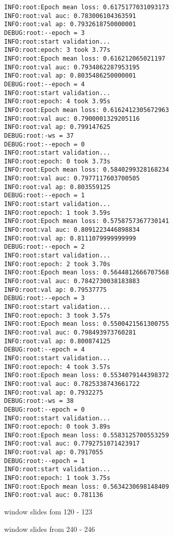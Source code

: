 \documentclass[11pt]{article}
\begin{document}
\begin{verbatim}
INFO:root:Epoch mean loss: 0.6175177031093173
INFO:root:val auc: 0.783006104363591
INFO:root:val ap: 0.7932618750000001
DEBUG:root:--epoch = 3
INFO:root:start validation...
INFO:root:epoch: 3 took 3.77s
INFO:root:Epoch mean loss: 0.616212065021197
INFO:root:val auc: 0.7934862287953195
INFO:root:val ap: 0.8035486250000001
DEBUG:root:--epoch = 4
INFO:root:start validation...
INFO:root:epoch: 4 took 3.95s
INFO:root:Epoch mean loss: 0.6162412305672963
INFO:root:val auc: 0.7900001329205116
INFO:root:val ap: 0.799147625
DEBUG:root:-ws = 37
DEBUG:root:--epoch = 0
INFO:root:start validation...
INFO:root:epoch: 0 took 3.73s
INFO:root:Epoch mean loss: 0.5840299328168234
INFO:root:val auc: 0.7977117603700505
INFO:root:val ap: 0.803559125
DEBUG:root:--epoch = 1
INFO:root:start validation...
INFO:root:epoch: 1 took 3.59s
INFO:root:Epoch mean loss: 0.5758757367730141
INFO:root:val auc: 0.8091223446898834
INFO:root:val ap: 0.8111079999999999
DEBUG:root:--epoch = 2
INFO:root:start validation...
INFO:root:epoch: 2 took 3.70s
INFO:root:Epoch mean loss: 0.5644812666707568
INFO:root:val auc: 0.7842730038183883
INFO:root:val ap: 0.79537775
DEBUG:root:--epoch = 3
INFO:root:start validation...
INFO:root:epoch: 3 took 3.57s
INFO:root:Epoch mean loss: 0.5500421561300755
INFO:root:val auc: 0.798493973760281
INFO:root:val ap: 0.800874125
DEBUG:root:--epoch = 4
INFO:root:start validation...
INFO:root:epoch: 4 took 3.57s
INFO:root:Epoch mean loss: 0.5534079144398372
INFO:root:val auc: 0.7825338743661722
INFO:root:val ap: 0.7932275
DEBUG:root:-ws = 38
DEBUG:root:--epoch = 0
INFO:root:start validation...
INFO:root:epoch: 0 took 3.89s
INFO:root:Epoch mean loss: 0.5583125700553259
INFO:root:val auc: 0.7792751071423917
INFO:root:val ap: 0.7917055
DEBUG:root:--epoch = 1
INFO:root:start validation...
INFO:root:epoch: 1 took 3.75s
INFO:root:Epoch mean loss: 0.5634230698148409
INFO:root:val auc: 0.781136
\end{verbatim}

window slides fom 120 - 123

window slides from 240 - 246
\end{document}
